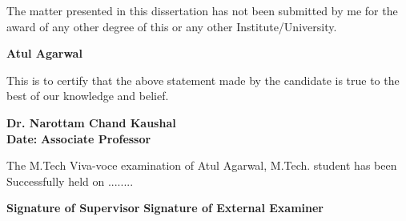 \par The matter presented in this dissertation has not been submitted by me for the award of any other degree of this or any other Institute/University.
\vspace{10mm}
\begin{flushright}
	\textbf{Atul Agarwal \\ 
	}
\end{flushright}
\vspace{5mm}
\par This is to certify that the above statement made by the candidate is true to the best of our knowledge and belief.
\vspace{5mm}
\begin{flushright}
	\textbf{Dr. Narottam Chand Kaushal} \\
		     \textbf{Date:} \hfill \textbf{Associate Professor} \\
		  
\end{flushright}
\vspace{5mm}
\par The M.Tech Viva-voce examination of Atul Agarwal, M.Tech. student has been Successfully held on ........
\vspace{5mm}
\begin{flushright}
\textbf{Signature of Supervisor} \hfill \textbf{Signature of External Examiner}
    
\end{flushright}